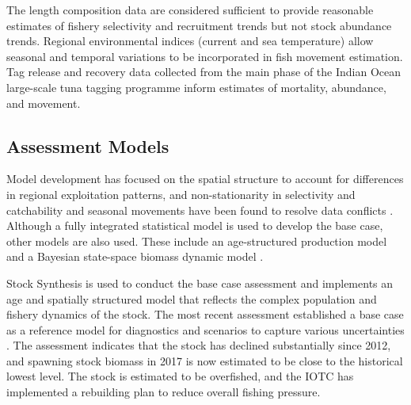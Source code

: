 \documentclass[11pt,a4paper]{article}
\begin{document}
{The length composition data are considered sufficient to provide reasonable estimates of fishery selectivity and recruitment trends but not stock abundance trends. Regional environmental indices (current and sea temperature) allow seasonal and temporal variations to be incorporated in fish movement estimation. Tag release and recovery data collected from the main phase of the Indian Ocean large-scale tuna tagging programme %
inform estimates of mortality, abundance, and movement. 


\subsection{Assessment Models}

Model development has focused on the spatial structure to account for differences in regional exploitation patterns, and non-stationarity in selectivity and catchability and seasonal movements have been found to resolve data conflicts \citep{urtizberea2018yft}. 
Although a fully integrated statistical model is used to develop the base case, other models are also used.  These include  an age-structured production model \citep[ASPM-R,][]{maunder2015contemporary} and a Bayesian state-space biomass dynamic model \citep[JABBA,][]{winker2018jabba}. 

Stock Synthesis \citep[SS,][]{methot2013stock} is used to conduct the base case assessment and implements an age and spatially structured model that reflects the complex population and fishery dynamics of the stock. The most recent assessment established a base case as a reference model for diagnostics and scenarios to capture various uncertainties \citep{fu2018yft}. The assessment indicates that the stock has declined substantially since 2012, and spawning stock biomass in 2017 is now estimated to be close to the historical lowest level. The stock is estimated to be overfished, and the IOTC has implemented a rebuilding plan to reduce overall fishing pressure.  


}
\end{document}

